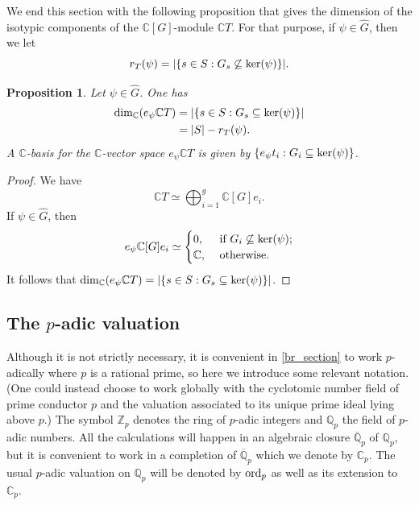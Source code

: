 \documentclass[11pt]{amsart}
\newtheorem{proposition}[theorem]{Proposition}
\numberwithin{equation}{section}
\theoremstyle{remark}
\theoremstyle{definition}
\begin{document}
We end this section with the following proposition that gives the dimension of the isotypic components of the $\mathbb{C}[G]$-module $\mathbb{C}T$.  For that purpose, if $\psi \in \widehat{G}$, then we let
\begin{equation} \label{the_r}
r_{T}(\psi) = |\{s \in S:G_{s} \not \subseteq {\rm ker}(\psi) \}|. 
\end{equation}
\begin{proposition} \label{dim_iso_component}
Let $\psi \in \widehat{G}$.  One has
\begin{equation*}
\begin{aligned}
{\rm dim}_{\mathbb{C}} (e_{\psi} \mathbb{C}T) &= |\{s \in S : G_{s} \subseteq {\rm ker}(\psi) \}| \\
&= |S| - r_{T}(\psi).
\end{aligned}
\end{equation*}
A $\mathbb{C}$-basis for the $\mathbb{C}$-vector space $e_{\psi}\mathbb{C}T$ is given by $\{e_{\psi} t_{i}: G_{i} \subseteq {\rm ker}(\psi) \}$.
\end{proposition}
\begin{proof}
We have
\begin{equation*}
\mathbb{C}T \simeq \bigoplus_{i=1}^{g} \mathbb{C}[G] e_{i}.
\end{equation*}
If $\psi \in \widehat{G}$, then 
\begin{equation*}
e_{\psi}\mathbb{C}[G]e_{i} \simeq 
\begin{cases}
0, & \text{ if } G_{i} \not \subseteq {\rm ker}(\psi);\\
\mathbb{C}, & \text{ otherwise}.
\end{cases}
\end{equation*}
It follows that ${\rm dim}_{\mathbb{C}} (e_{\psi} \mathbb{C}T) = |\{s \in S : G_{s} \subseteq {\rm ker}(\psi) \}|$.
\end{proof}

\subsection{The \texorpdfstring{$p$}{p}-adic valuation} \label{section:pad}
Although it is not strictly necessary, it is convenient in \cref{br_section} to work $p$-adically where $p$ is a rational prime, so here we introduce some relevant notation.  (One could instead choose to work globally with the cyclotomic number field of prime conductor $p$ and the valuation associated to its unique prime ideal lying above $p$.)  The symbol $\mathbb{Z}_{p}$ denotes the ring of $p$-adic integers and $\mathbb{Q}_{p}$ the field of $p$-adic numbers.  All the calculations will happen in an algebraic closure $\overline{\mathbb{Q}}_{p}$ of $\mathbb{Q}_{p}$, but it is convenient to work in a completion of $\overline{\mathbb{Q}}_{p}$ which we denote by $\mathbb{C}_{p}$.  The usual $p$-adic valuation on $\mathbb{Q}_{p}$ will be denoted by ${\rm ord}_{p}$ as well as its extension to $\mathbb{C}_{p}$.
\end{document}
